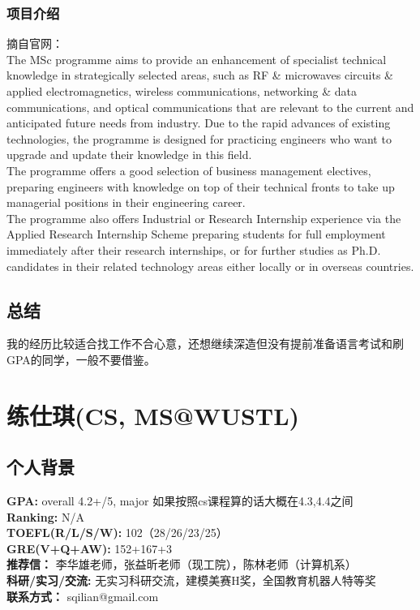 \documentclass[a4paper,UTF8]{book}
\begin{document}
        \subsubsection*{项目介绍}
        摘自官网：\\
        The MSc programme aims to provide an enhancement of specialist technical knowledge in strategically selected areas, such as RF \& microwaves circuits \& applied electromagnetics, wireless communications, networking \& data communications, and optical communications that are relevant to the current and anticipated future needs from industry. Due to the rapid advances of existing technologies, the programme is designed for practicing engineers who want to upgrade and update their knowledge in this field.\\
        The programme offers a good selection of business management electives, preparing engineers with knowledge on top of their technical fronts to take up managerial positions in their engineering career.\\
        The programme also offers Industrial or Research Internship experience via the Applied Research Internship Scheme preparing students for full employment immediately after their research internships, or for further studies as Ph.D. candidates in their related technology areas either locally or in overseas countries.

    \subsection*{总结}
    我的经历比较适合找工作不合心意，还想继续深造但没有提前准备语言考试和刷GPA的同学，一般不要借鉴。

\clearpage
\section{练仕琪(CS, MS@WUSTL)}
    \subsection*{个人背景}
        \textbf{GPA:} overall 4.2+/5, major 如果按照cs课程算的话大概在4.3,4.4之间\\
        \textbf{Ranking:} N/A\\
        \textbf{TOEFL(R/L/S/W):} 102（28/26/23/25）\\
        \textbf{GRE(V+Q+AW):} 152+167+3\\
        \textbf{推荐信：} 李华雄老师，张益昕老师（现工院），陈林老师（计算机系）\\
        \textbf{科研/实习/交流:} 无实习科研交流，建模美赛H奖，全国教育机器人特等奖\\ 
        \textbf{联系方式：} sqilian@gmail.com
\end{document}
